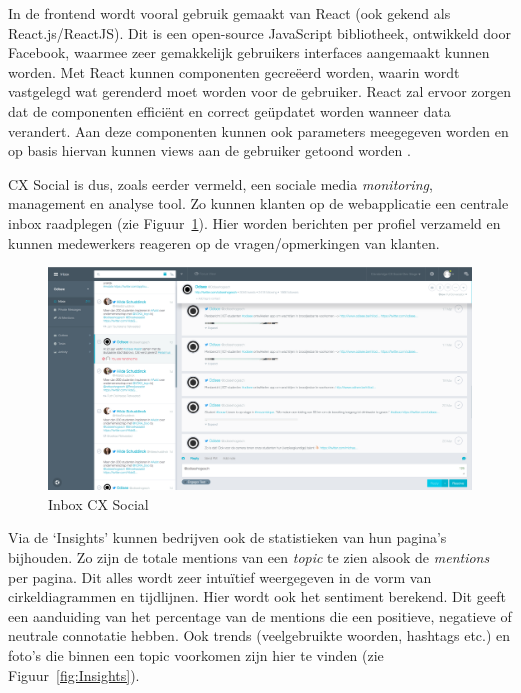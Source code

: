 In de frontend wordt vooral gebruik gemaakt van React (ook gekend als React.js/ReactJS). Dit is een open-source JavaScript bibliotheek, ontwikkeld door Facebook, waarmee zeer gemakkelijk gebruikers interfaces aangemaakt kunnen worden. Met React kunnen componenten gecre\"{e}erd worden, waarin wordt vastgelegd wat gerenderd moet worden voor de gebruiker. React zal ervoor zorgen dat de componenten effici\"{e}nt en correct ge\"{u}pdatet worden wanneer data verandert. Aan deze componenten kunnen ook parameters meegegeven worden en op basis hiervan kunnen views aan de gebruiker getoond worden \cite{React}. 

CX Social is dus, zoals eerder vermeld, een sociale media \textit{monitoring}, management en analyse tool. Zo kunnen klanten op de webapplicatie een centrale inbox raadplegen (zie Figuur~\ref{fig:Inbox}). Hier worden berichten per profiel verzameld en kunnen medewerkers reageren op de vragen/opmerkingen van klanten. 

\begin{figure}[H]
	\centering
	\includegraphics[width=1\textwidth]{Figuren/Inbox.png}
	\caption{Inbox CX Social \cite{EngagorScreenshots}} %
	\label{fig:Inbox}
\end{figure} 

Via de `Insights' kunnen bedrijven ook de statistieken van hun pagina's bijhouden. Zo zijn de totale mentions van een \textit{topic} te zien alsook de \textit{mentions} per pagina. Dit alles wordt zeer intu\"{i}tief  weergegeven in de vorm van cirkeldiagrammen en tijdlijnen. Hier wordt ook het sentiment berekend. Dit geeft een aanduiding van het percentage van de mentions die een positieve, negatieve of neutrale connotatie hebben. Ook trends (veelgebruikte woorden, hashtags  etc.) en foto's die binnen een topic voorkomen zijn hier te vinden (zie Figuur~\ref{fig:Insights}).  

